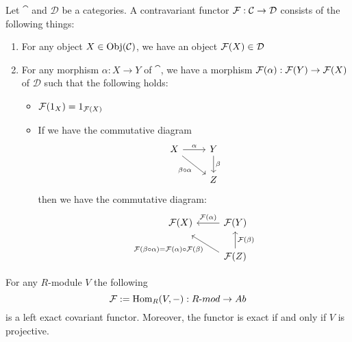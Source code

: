 \medskip 

\begin{defn} 
    Let $\cat$ and $\mathcal D$ be a categories. A contravariant functor $\mathcal F:\mathcal C \to \mathcal D$ consists of the following things:
    \begin{enumerate}
        \item For any object $X\in \operatorname{Obj}(\mathcal C)$, we have an object $\mathcal F(X)\in \mathcal D$
        
        \item For any morphism $\alpha:X\to Y$ of $\cat$, we have a morphism $\mathcal F(\alpha):\mathcal F(Y)\to \mathcal F(X)$ of $\mathcal D$ such that the following holds:
        \begin{itemize}
            \item $\mathcal F(1_X) = 1_{\mathcal F(X)}$
            \item If we have the commutative diagram
            \[\begin{tikzcd}[sep=small]
	        X && Y \\
	        \\
	        && Z
	        \arrow["\alpha", from=1-1, to=1-3]
	        \arrow["{\beta\circ \alpha}"', from=1-1, to=3-3]
	        \arrow["\beta", from=1-3, to=3-3]
            \end{tikzcd}\]
            then we have the commutative diagram:
            \[\begin{tikzcd}[sep=small]
	        {\f(X)} && {\f(Y)} \\
	        \\
	        && {\f(Z)}
	        \arrow["{\f(\alpha)}"', from=1-3, to=1-1]
	        \arrow["{\f(\beta\circ \alpha) = \f(\alpha) \circ \f(\beta)}", shift left=2, from=3-3, to=1-1]
	        \arrow["{\f(\beta)}"', from=3-3, to=1-3]
            \end{tikzcd}\]
        \end{itemize}
    \end{enumerate}
\end{defn}

\medskip

\begin{cor}
    For any $R$-module $V$ the following
    \[\mathcal F:=\operatorname{Hom}_R(V,-):R\text{-}mod \to Ab\]
    is a left exact covariant functor. Moreover, the functor is exact if and only if $V$ is projective.
\end{cor}


